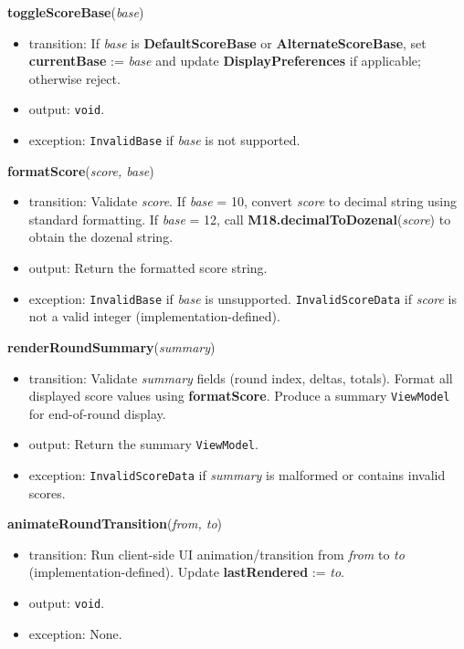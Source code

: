 \documentclass[12pt, titlepage]{article}
\begin{document}
\noindent\textbf{toggleScoreBase}(\textit{base})
\begin{itemize}
    \item transition: If \textit{base} is \textbf{DefaultScoreBase} or \textbf{AlternateScoreBase}, set \textbf{currentBase} := \textit{base} and update \textbf{DisplayPreferences} if applicable; otherwise reject.
    \item output: \texttt{void}.
    \item exception: \texttt{InvalidBase} if \textit{base} is not supported.
\end{itemize}

\noindent\textbf{formatScore}(\textit{score, base})
\begin{itemize}
    \item transition: Validate \textit{score}. If \textit{base} = 10, convert \textit{score} to decimal string using standard formatting. If \textit{base} = 12, call \textbf{M18.decimalToDozenal}(\textit{score}) to obtain the dozenal string.
    \item output: Return the formatted score string.
    \item exception: \texttt{InvalidBase} if \textit{base} is unsupported. \texttt{InvalidScoreData} if \textit{score} is not a valid integer (implementation-defined).
\end{itemize}

\noindent\textbf{renderRoundSummary}(\textit{summary})
\begin{itemize}
    \item transition: Validate \textit{summary} fields (round index, deltas, totals). Format all displayed score values using \textbf{formatScore}. Produce a summary \texttt{ViewModel} for end-of-round display.
    \item output: Return the summary \texttt{ViewModel}.
    \item exception: \texttt{InvalidScoreData} if \textit{summary} is malformed or contains invalid scores.
\end{itemize}

\noindent\textbf{animateRoundTransition}(\textit{from, to})
\begin{itemize}
    \item transition: Run client-side UI animation/transition from \textit{from} to \textit{to} (implementation-defined). Update \textbf{lastRendered} := \textit{to}.
    \item output: \texttt{void}.
    \item exception: None.
\end{itemize}
\end{document}
